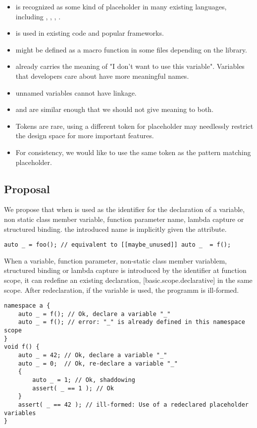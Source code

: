 \documentclass{wg21}
\begin{document}
\begin{itemize}
\item \tcode{_} is recognized as some kind of placeholder in many existing languages, including , , , .
\item \tcode{_} is used in existing code and popular frameworks.
\item \tcode{_} might be defined as a macro function in some files depending on the  library.
\item \tcode{_} already carries the meaning of "I don't want to use this variable". Variables that developers care about have more meaningful names.
\item \tcode{_} unnamed variables cannot have linkage.
\item \tcode{_} and \tcode{__} are similar enough that we should not give meaning to both.
\item Tokens are rare, using a different token for placeholder may needlessly restrict the design space for more important features.
\item For consistency, we would like to use the same token as the pattern matching placeholder.
\end{itemize}

\subsection{Proposal}

We propose that when \tcode{_} is used as the identifier for the declaration of a variable, non static class member variable, function parameter name,
lambda capture or structured binding.
the introduced name is implicitly given the  attribute.

\begin{example}
\begin{lstlisting}[style=color]
auto _ = foo(); // equivalent to [[maybe_unused]] auto _  = f();
\end{lstlisting}
\end{example}

When a variable, function parameter, non-static class member variablem, structured binding or lambda capture is introduced by the identifier \tcode{_}
at function scope, it can redefine an existing declaration, [basic.scope.declarative] in the same scope. After redeclaration, if the variable is used, the programm is ill-formed.

\begin{example}
\begin{lstlisting}[style=color]
namespace a {
    auto _ = f(); // Ok, declare a variable "_"
    auto _ = f(); // error: "_" is already defined in this namespace scope
}
void f() {
    auto _ = 42; // Ok, declare a variable "_"
    auto _ = 0;  // Ok, re-declare a variable "_"
    {
        auto _ = 1; // Ok, shaddowing
        assert( _ == 1 ); // Ok
    }
    assert( _ == 42 ); // ill-formed: Use of a redeclared placeholder variables
}
\end{lstlisting}
\end{example}
\end{document}

